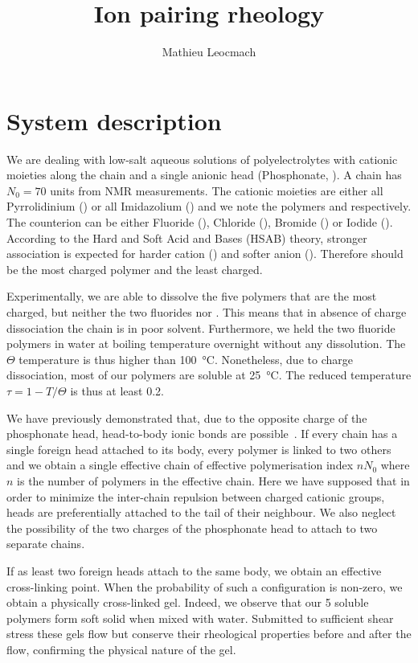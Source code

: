 \documentclass[12pt,a4paper,prl,reprint]{revtex4-1}
\begin{document}
\author{Mathieu Leocmach}
\title{Ion pairing rheology}
\maketitle

\section{System description}

We are dealing with low-salt aqueous solutions of polyelectrolytes with cationic moieties along the chain and a single anionic head (Phosphonate, ). A chain has $N_0 = 70$ units from NMR measurements. The cationic moieties are either all Pyrrolidinium () or all Imidazolium () and we note the polymers  and  respectively. The counterion  can be either Fluoride (), Chloride (), Bromide () or Iodide (). According to the Hard and Soft Acid and Bases (HSAB) theory, stronger association is expected for harder cation () and softer anion (). Therefore  should be the most charged polymer and  the least charged.

Experimentally, we are able to dissolve the five polymers that are the most charged, but neither the two fluorides nor . This means that in absence of charge dissociation the chain is in poor solvent. Furthermore, we held the two fluoride polymers in water at boiling temperature overnight without any dissolution. The $\Theta$ temperature is thus higher than \SI{100}{\celsius}. Nonetheless, due to charge dissociation, most of our polymers are soluble at \SI{25}{\celsius}. The reduced temperature $\tau = 1 - T/\Theta$ is thus at least 0.2.

We have previously demonstrated that, due to the opposite charge of the phosphonate head, head-to-body ionic bonds are possible~\cite{Srour2014}. If every chain has a single foreign head attached to its body, every polymer is linked to two others and we obtain a single effective chain of effective polymerisation index $n N_0$ where $n$ is the number of polymers in the effective chain. Here we have supposed that in order to minimize the inter-chain repulsion between charged cationic groups, heads are preferentially attached to the tail of their neighbour. We also neglect the possibility of the two charges of the phosphonate head to attach to two separate chains.

If as least two foreign heads attach to the same body, we obtain an effective cross-linking point. When the probability of such a configuration is non-zero, we obtain a physically cross-linked gel. Indeed, we observe that our 5 soluble polymers form soft solid when mixed with water. Submitted to sufficient shear stress these gels flow but conserve their rheological properties before and after the flow, confirming the physical nature of the gel.
\end{document}
